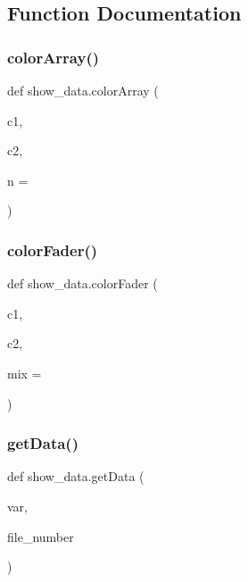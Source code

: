 \subsection{Function Documentation}
\mbox{\label{namespaceshow__data_af808c5113008c209a2337873011349e3}} 
\subsubsection{\texorpdfstring{color\+Array()}{colorArray()}}
{\footnotesize\ttfamily def show\+\_\+data.\+color\+Array (\begin{DoxyParamCaption}\item[{}]{c1,  }\item[{}]{c2,  }\item[{}]{n = {} }\end{DoxyParamCaption})}

\mbox{\label{namespaceshow__data_a873cf61b0f5e496268ec471d2213a8d0}} 
\subsubsection{\texorpdfstring{color\+Fader()}{colorFader()}}
{\footnotesize\ttfamily def show\+\_\+data.\+color\+Fader (\begin{DoxyParamCaption}\item[{}]{c1,  }\item[{}]{c2,  }\item[{}]{mix = {} }\end{DoxyParamCaption})}

\mbox{\label{namespaceshow__data_a2c2fe221957ed1df5ec9cac78fa84c63}} 
\subsubsection{\texorpdfstring{get\+Data()}{getData()}}
{\footnotesize\ttfamily def show\+\_\+data.\+get\+Data (\begin{DoxyParamCaption}\item[{}]{var,  }\item[{}]{file\+\_\+number }\end{DoxyParamCaption})}

